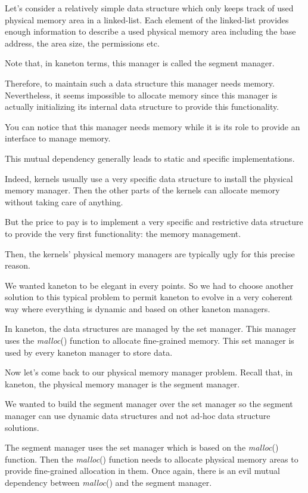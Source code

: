 Let's consider a relatively simple data structure which only keeps track
of used physical memory area in a linked-list. Each element of the
linked-list provides enough information to describe a used physical memory
area including the base address, the area size, the permissions etc.

Note that, in kaneton terms, this manager is called the segment manager.

Therefore, to maintain such a data structure this manager needs memory.
Nevertheless, it seems impossible to allocate memory since this manager
is actually initializing its internal data structure to provide this
functionality.

You can notice that this manager needs memory while it is its role to provide
an interface to manage memory.

This mutual dependency generally leads to static and specific implementations.

Indeed, kernels usually use a very specific data structure to install
the physical memory manager. Then the other parts of the kernels can allocate
memory without taking care of anything.

But the price to pay is to implement a very specific and restrictive
data structure to provide the very first functionality: the memory management.

Then, the kernels' physical memory managers are typically ugly for this
precise reason.

We wanted kaneton to be elegant in every points. So we had to choose another
solution to this typical problem to permit kaneton to evolve in a very
coherent way where everything is dynamic and based on other kaneton
managers.

In kaneton, the data structures are managed by the set manager. This
manager uses the \textit{malloc}() function to allocate fine-grained memory.
This set manager is used by every kaneton manager to store data.

Now let's come back to our physical memory manager problem. Recall that, in
kaneton, the physical memory manager is the segment manager.

We wanted to build the segment manager over the set manager so the segment
manager can use dynamic data structures and not ad-hoc data structure
solutions.

The segment manager uses the set manager which is based on the
\textit{malloc}() function. Then the \textit{malloc}() function needs to
allocate physical memory areas to provide fine-grained allocation in them.
Once again, there is an evil mutual dependency between \textit{malloc}()
and the segment manager.

